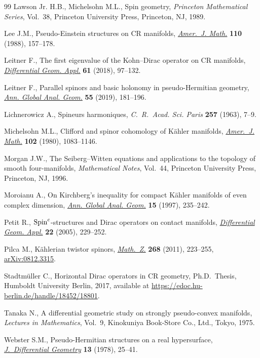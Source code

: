 \documentclass[pdftex]{sigma}
\numberwithin{equation}{section}
\begin{document}
\begin{thebibliography}{99}
Lawson Jr. H.B., Michelsohn M.L., Spin geometry, \textit{Princeton Mathematical
 Series}, Vol.~38, Princeton University Press, Princeton, NJ, 1989.

Lee J.M., Pseudo-{E}instein structures on {CR} manifolds, \href{https://doi.org/10.2307/2374543}{\textit{Amer.~J.
 Math.}} \textbf{110} (1988), 157--178.

Leitner F., The first eigenvalue of the {K}ohn--{D}irac operator on {CR}
 manifolds, \href{https://doi.org/10.1016/j.difgeo.2018.08.004}{\textit{Differential Geom. Appl.}} \textbf{61} (2018), 97--132.

Leitner F., Parallel spinors and basic holonomy in pseudo-{H}ermitian geometry,
 \href{https://doi.org/10.1007/s10455-018-9622-4}{\textit{Ann. Global Anal. Geom.}} \textbf{55} (2019), 181--196.

Lichnerowicz A., Spineurs harmoniques, \textit{C.~R.~Acad. Sci. Paris}
 \textbf{257} (1963), 7--9.

Michelsohn M.L., Clifford and spinor cohomology of {K}\"ahler manifolds,
 \href{https://doi.org/10.2307/2374181}{\textit{Amer.~J. Math.}} \textbf{102} (1980), 1083--1146.

Morgan J.W., The {S}eiberg--{W}itten equations and applications to the topology
 of smooth four-manifolds, \textit{Mathematical Notes}, Vol.~44, Princeton
 University Press, Princeton, NJ, 1996.

Moroianu A., On {K}irchberg's inequality for compact {K}\"ahler manifolds of
 even complex dimension, \href{https://doi.org/10.1023/A:1006543304443}{\textit{Ann. Global Anal. Geom.}} \textbf{15} (1997),
 235--242.

Petit R., {${\rm Spin}^c$}-structures and {D}irac operators on contact
 manifolds, \href{https://doi.org/10.1016/j.difgeo.2005.01.003}{\textit{Differential Geom. Appl.}} \textbf{22} (2005), 229--252.

Pilca M., K\"ahlerian twistor spinors, \href{https://doi.org/10.1007/s00209-010-0668-7}{\textit{Math.~Z.}} \textbf{268} (2011),
 223--255, \href{https://arxiv.org/abs/0812.3315}{arXiv:0812.3315}.

Stadtm\"uller C., Horizontal Dirac operators in CR geometry, Ph.D.~Thesis,
 {H}umboldt University Berlin, 2017, available at
 \url{https://edoc.hu-berlin.de/handle/18452/18801}.

Tanaka N., A differential geometric study on strongly pseudo-convex manifolds,
 \textit{Lectures in Mathematics}, Vol.~9, Kinokuniya Book-Store Co., Ltd.,
 Tokyo, 1975.

Webster S.M., Pseudo-{H}ermitian structures on a real hypersurface,
 \href{https://doi.org/10.4310/jdg/1214434345}{\textit{J.~Differential Geometry}} \textbf{13} (1978), 25--41.

\end{thebibliography}\LastPageEnding
\end{document}
